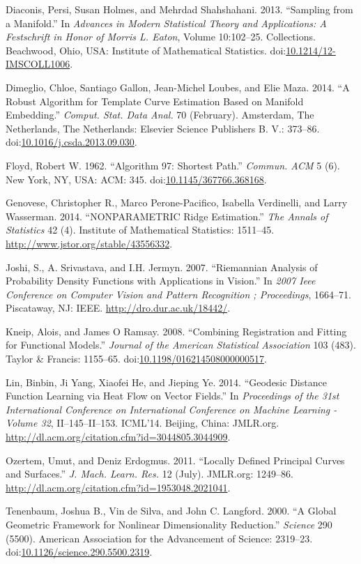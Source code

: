 \hypertarget{ref-Diaconis2013}{}
Diaconis, Persi, Susan Holmes, and Mehrdad Shahshahani. 2013. ``Sampling
from a Manifold.'' In \emph{Advances in Modern Statistical Theory and
Applications: A Festschrift in Honor of Morris L. Eaton}, Volume
10:102--25. Collections. Beachwood, Ohio, USA: Institute of Mathematical
Statistics.
doi:\href{https://doi.org/10.1214/12-IMSCOLL1006}{10.1214/12-IMSCOLL1006}.

\hypertarget{ref-Dimeglio2014}{}
Dimeglio, Chloe, Santiago Gallon, Jean-Michel Loubes, and Elie Maza.
2014. ``A Robust Algorithm for Template Curve Estimation Based on
Manifold Embedding.'' \emph{Comput. Stat. Data Anal.} 70 (February).
Amsterdam, The Netherlands, The Netherlands: Elsevier Science Publishers
B. V.: 373--86.
doi:\href{https://doi.org/10.1016/j.csda.2013.09.030}{10.1016/j.csda.2013.09.030}.

\hypertarget{ref-Floyd1962}{}
Floyd, Robert W. 1962. ``Algorithm 97: Shortest Path.'' \emph{Commun.
ACM} 5 (6). New York, NY, USA: ACM: 345.
doi:\href{https://doi.org/10.1145/367766.368168}{10.1145/367766.368168}.

\hypertarget{ref-Genovese2014}{}
Genovese, Christopher R., Marco Perone-Pacifico, Isabella Verdinelli,
and Larry Wasserman. 2014. ``NONPARAMETRIC Ridge Estimation.'' \emph{The
Annals of Statistics} 42 (4). Institute of Mathematical Statistics:
1511--45. \url{http://www.jstor.org/stable/43556332}.

\hypertarget{ref-Joshi2007}{}
Joshi, S., A. Srivastava, and I.H. Jermyn. 2007. ``Riemannian Analysis
of Probability Density Functions with Applications in Vision.'' In
\emph{2007 Ieee Conference on Computer Vision and Pattern Recognition ;
Proceedings}, 1664--71. Piscataway, NJ: IEEE.
\url{http://dro.dur.ac.uk/18442/}.

\hypertarget{ref-Kneip2008}{}
Kneip, Alois, and James O Ramsay. 2008. ``Combining Registration and
Fitting for Functional Models.'' \emph{Journal of the American
Statistical Association} 103 (483). Taylor \& Francis: 1155--65.
doi:\href{https://doi.org/10.1198/016214508000000517}{10.1198/016214508000000517}.

\hypertarget{ref-Lin2014}{}
Lin, Binbin, Ji Yang, Xiaofei He, and Jieping Ye. 2014. ``Geodesic
Distance Function Learning via Heat Flow on Vector Fields.'' In
\emph{Proceedings of the 31st International Conference on International
Conference on Machine Learning - Volume 32}, II--145--II--153. ICML'14.
Beijing, China: JMLR.org.
\url{http://dl.acm.org/citation.cfm?id=3044805.3044909}.

\hypertarget{ref-Ozertem2011}{}
Ozertem, Umut, and Deniz Erdogmus. 2011. ``Locally Defined Principal
Curves and Surfaces.'' \emph{J. Mach. Learn. Res.} 12 (July). JMLR.org:
1249--86. \url{http://dl.acm.org/citation.cfm?id=1953048.2021041}.

\hypertarget{ref-Tenenbaum2000}{}
Tenenbaum, Joshua B., Vin de Silva, and John C. Langford. 2000. ``A
Global Geometric Framework for Nonlinear Dimensionality Reduction.''
\emph{Science} 290 (5500). American Association for the Advancement of
Science: 2319--23.
doi:\href{https://doi.org/10.1126/science.290.5500.2319}{10.1126/science.290.5500.2319}.
